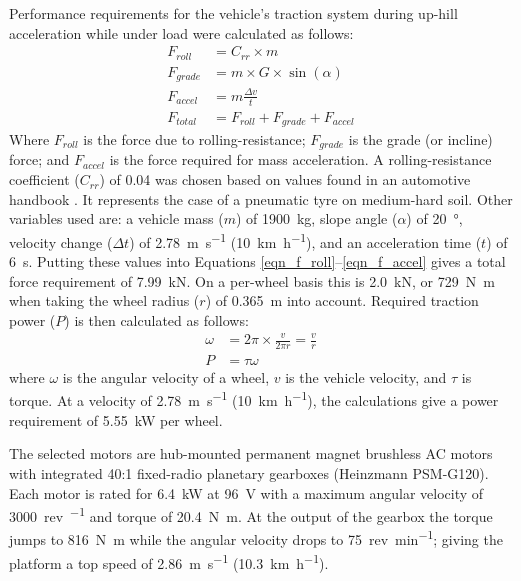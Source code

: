 \documentclass[preprint,authoryear,12pt]{elsarticle}
\begin{document}

        Performance requirements for the vehicle's traction system during up-hill acceleration while under load were calculated as follows:
        \begin{align}
        \label{eqn_f_roll}
        F_{roll} &= C_{rr} \times m\\
        F_{grade} &= m \times G \times \sin(\alpha)\\
        F_{accel} &= m \frac{\Delta v}{t}\\
        \label{eqn_f_accel}
        F_{total} &= F_{roll} + F_{grade} + F_{accel}
        \end{align}
        Where $F_{roll}$ is the force due to rolling-resistance; $F_{grade}$ is the grade (or incline) force; and $F_{accel}$ is the force required for mass acceleration.
        A rolling-resistance coefficient ($C_{rr}$) of 0.04 was chosen based on values found in an automotive handbook \citep{RobertBoschGmbH2002}.
        It represents the case of a pneumatic tyre on medium-hard soil.
        Other variables used are: a vehicle mass ($m$) of \SI{1900}{\kilo\gram}, slope angle ($\alpha$) of \SI{20}{\degree}, velocity change ($\Delta t$) of \SI{2.78}{\metre\per\second} (\SI{10}{\kilo\meter\per\hour}), and an acceleration time ($t$) of \SI{6}{\second}.
        Putting these values into Equations \ref{eqn_f_roll}--\ref{eqn_f_accel} gives a total force requirement of \SI{7.99}{\kilo\newton}.
        On a per-wheel basis this is \SI{2.0}{\kilo\newton}, or \SI{729}{\newton\meter} when taking the wheel radius ($r$) of \SI{0.365}{\meter} into account.
        Required traction power ($P$) is then calculated as follows:
        \begin{align}
        \label{eqn_f_power}
        \omega &= 2 \pi \times \frac{v}{2 \pi r} = \frac{v}{r}\\
        P &= \tau \omega
        \end{align}
        where $\omega$ is the angular velocity of a wheel, $v$ is the vehicle velocity, and $\tau$ is torque.
        At a velocity of \SI{2.78}{\meter\per\second} (\SI{10}{\kilo\meter\per\hour}), the calculations give a power requirement of \SI{5.55}{\kilo\watt} per wheel.

        The selected motors are hub-mounted permanent magnet brushless AC motors with integrated 40:1 fixed-radio planetary gearboxes (Heinzmann PSM-G120).
        Each motor is rated for \SI{6.4}{\kilo\watt} at \SI{96}{\volt} with a maximum angular velocity of \SI{3000}{rev\per\min} and torque of \SI{20.4}{\newton\meter}.
        At the output of the gearbox the torque jumps to \SI{816}{\newton\meter} while the angular velocity drops to \SI{75}{rev\per\minute}; giving the platform a top speed of \SI{2.86}{\meter\per\second} (\SI{10.3}{\kilo\meter\per\hour}).
\end{document}
